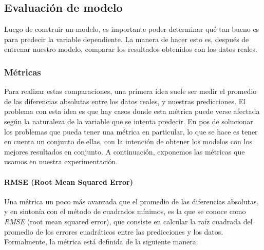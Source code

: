 \subsection{Evaluación de modelo}  
    Luego de construir un modelo, es importante poder determinar qué tan bueno es para predecir la variable dependiente. La manera de hacer esto es, después de entrenar nuestro modelo, comparar los resultados obtenidos con los datos reales.
    
    
    \subsubsection{Métricas}
  
    Para realizar estas comparaciones, una primera idea suele ser medir el promedio de las diferencias absolutas entre los datos reales, y nuestras predicciones. El problema con esta idea es que hay casos donde esta métrica puede verse afectada según la naturaleza de la variable que se intenta predecir. En pos de solucionar los problemas que pueda tener una métrica en particular, lo que se hace es tener en cuenta un conjunto de ellas, con la intención de obtener los modelos con los mejores resultados en conjunto. A continuación, exponemos las métricas que usamos en nuestra experimentación.
    

        \paragraph{RMSE (Root Mean Squared Error)}\mbox{}\vspace{1em}
        
        Una métrica un poco más avanzada que el promedio de las diferencias absolutas, y en sintonía con el método de cuadrados mínimos, es la que se conoce como \emph{RMSE} (root mean squared error), que consiste en calcular la raíz cuadrada del promedio de los errores cuadráticos entre las predicciones y los datos. Formalmente, la métrica está definida de la siguiente manera:
        

